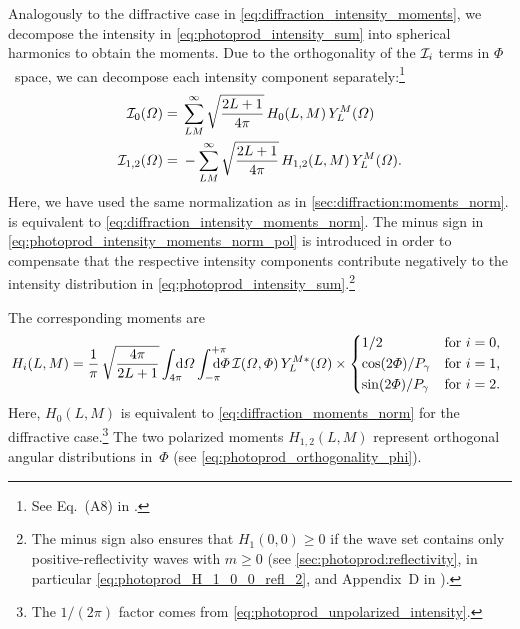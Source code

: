 Analogously to the diffractive case in
\cref{eq:diffraction_intensity_moments}, we decompose the intensity in
\cref{eq:photoprod_intensity_sum} into spherical harmonics to obtain
the moments.  Due to the orthogonality of the $\mathcal{I}_i$ terms in
$\Phi$~space, we can decompose each intensity component
separately:\footnote{See Eq.~(A8) in .}
\begin{align}
  \label{eq:photoprod_intensity_moments_norm_unpol}
  \mathcal{I}_0(\Omega)
  ={}& \sum_{L M}^\infty \sqrt{\frac{2 L + 1}{4 \pi}}\, H_0(L, M)\, Y_L^M(\Omega)
  \\
  \label{eq:photoprod_intensity_moments_norm_pol}
  \mathcal{I}_{1, 2}(\Omega)
  ={}& -\sum_{L M}^\infty \sqrt{\frac{2 L + 1}{4 \pi}}\, H_{1, 2}(L, M)\, Y_L^M(\Omega).
\end{align}
Here, we have used the same normalization as in
\cref{sec:diffraction:moments_norm}.
 is equivalent to
\cref{eq:diffraction_intensity_moments_norm}.  The minus sign in
\cref{eq:photoprod_intensity_moments_norm_pol} is introduced in order
to compensate that the respective intensity components contribute
negatively to the intensity distribution in
\cref{eq:photoprod_intensity_sum}.\footnote{\label{fn:photoprod_intensity_sign}The
minus sign also ensures that $H_1(0, 0) \geq 0$ if the wave set
contains only positive-reflectivity waves with $m \geq 0$ (see
\cref{sec:photoprod:reflectivity}, in particular
\cref{eq:photoprod_H_1_0_0_refl_2}, and Appendix~D in
).}

The corresponding moments are
\begin{equation}
  \label{eq:photoprod_moments_norm}
  H_i(L, M)
  = \frac{1}{\pi}\, \sqrt{\frac{4 \pi}{2 L + 1}} \int_{4 \pi}\!\!\!\! \dif{\Omega} \int_{-\pi}^{+\pi}\hspace{-1.2em} \dif{\Phi}\,
  \intensity(\Omega, \Phi)\, Y_L^{M *}(\Omega) \times \begin{cases*}
    1 / 2                   & for $i = 0$, \\
    \cos(2 \Phi) / P_\gamma & for $i = 1$, \\
    \sin(2 \Phi) / P_\gamma & for $i = 2$.
  \end{cases*}
\end{equation}
Here, $H_0(L, M)$ is equivalent to \cref{eq:diffraction_moments_norm}
for the diffractive case.\footnote{The $1 / (2 \pi)$ factor comes from
\cref{eq:photoprod_unpolarized_intensity}.}  The two polarized moments
$H_{1, 2}(L, M)$ represent orthogonal angular distributions in~$\Phi$
(see \cref{eq:photoprod_orthogonality_phi}).


